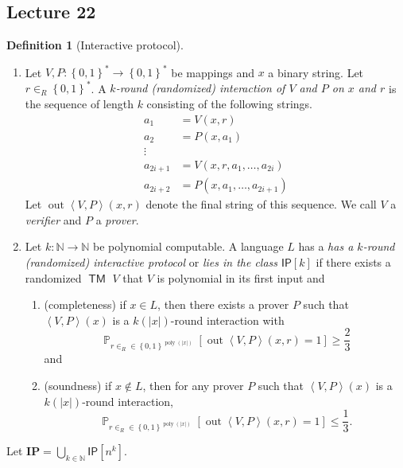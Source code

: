\documentclass[10pt,letterpaper,cm]{nupset}
\theoremstyle{definition}
\newtheorem{definition}{Definition}[subsection]
\theoremstyle{theorem}
\theoremstyle{remark}
\newcommand{\N}{\mathbb N}
\newcommand{\1}{\mathbf{1}}
\newcommand{\0}{\vec 0}
\DeclareMathOperator{\out}{out}
\DeclareMathOperator{\pr}{\mathbb{P}}
\DeclareMathOperator{\TM}{\mathsf{TM}}
\DeclareMathOperator{\poly}{poly}
\begin{document}
\subsection{Lecture 22}

\begin{definition}[Interactive protocol] $ $
\begin{enumerate}
\item  Let $V, P: \left\{0,1\right\}^{\ast} \to \left\{0,1\right\}^{\ast}$ be mappings and $x$ a binary string. Let $r\in_R \left\{0,1\right\}^{\ast}$. A \textit{$k$-round (randomized) interaction of $V$ and $P$ on $x$ and $r$} is the sequence of length $k$  consisting of the following strings.
\[
\begin{aligned} a_{1} &=V(x, r) \\ a_{2} &=P\left(x, a_{1}\right) \\ \vdots & \\ a_{2 i+1} &=V\left(x,r, a_{1}, \ldots, a_{2 i}\right) \\ a_{2 i+2} &=P\left(x, a_{1}, \ldots, a_{2 i+1}\right) \end{aligned}
\] Let $\out{\left\langle V, P\right\rangle(x, r)}$ denote the final string of this sequence. We call $V$ a \textit{verifier} and $P$ a \textit{prover}.
\item Let $k : \N \to \N$ be polynomial computable. A language $L$ has a \textit{has a $k$-round (randomized) interactive protocol} or \textit{lies in the class $\mathsf{IP}[k]$} if there exists a randomized $\TM$ $V$ that $V$ is polynomial in its first input and
\begin{enumerate}
\item (completeness) if $x\in L$, then there exists a prover $P$ such that $\left\langle V, P\right\rangle(x)$ is a $k(\left\lvert{x}\right\rvert)$-round interaction with $$\pr_{r\in_R \in \left\{0,1\right\}^{\poly(\left\lvert{x}\right\rvert)}}\left[\out{\left\langle V, P\right\rangle(x, r)} =1\right] \geq \frac{2}{3}$$ and 
\item (soundness) if $x\notin L$, then for any prover $P$ such that $\left\langle V, P\right\rangle(x)$ is a $k(\left\lvert{x}\right\rvert)$-round interaction, $$\pr_{r\in_R \in \left\{0,1\right\}^{\poly(\left\lvert{x}\right\rvert)}}\left[\out{\left\langle V, P\right\rangle(x, r)} =1\right] \leq \frac{1}{3}.$$
\end{enumerate}
\end{enumerate}
Let $\mathbf{IP} = \bigcup_{k\in \N}\mathsf{IP}\left[n^k\right]$.
\end{definition}
\end{document}
